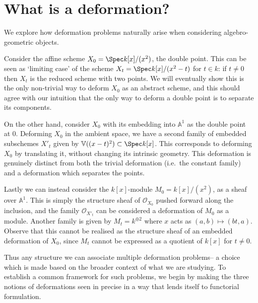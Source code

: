 \section{What is a deformation?}\label{section-whats-a-deformation}

We explore how deformation problems naturally arise when considering
algebro-geometric objects.

\begin{example}
    \label{example-double-point-1}
    Consider the affine scheme \(X_0=\Spec k[x]/(x^2)\), the double point. This
    can be seen as `limiting case' of the scheme \(X_t = \Spec k[x]/(x^2-t)\)
    for \(t\in k\): if \(t\neq 0\) then \(X_t\) is the reduced scheme with two
    points. We will eventually show this is the only non-trivial way to deform
    \(X_0\) as an abstract scheme, and this should agree with our intuition that
    the only way to deform a double point is to separate its components.

    On the other hand, consider \(X_0\) with its embedding into
    \(\mathbb{A}^1\) as the double point at \(0\). Deforming \(X_0\) in the
    ambient space, we have a second family of embedded subschemes \(X'_t\) given
    by \(\mathbb{V}((x-t)^2) \subset \Spec k[x]\). This corresponds to
    deforming \(X_0\) by translating it, without changing its intrinsic
    geometry. This deformation is genuinely distinct from both the trivial
    deformation (i.e.\ the constant family) and a deformation which separates
    the points.

    Lastly we can instead consider the \(k[x]\)-module \(M_0 = k[x]/(x^2)\), as
    a sheaf over \(\mathbb{A}^1\). This is simply the structure sheaf of
    \(\mathscr{O}_{X_0}\) pushed forward along the inclusion, and the family
    \(\mathscr{O}_{X'_t}\) can be considered a deformation of \(M_0\)
    as a module. Another family is given by \(M_t = k^{\oplus 2}\) where \(x\)
    acts as \((a,b) \mapsto (bt, a)\). Observe that this cannot be realised as
    the structure sheaf of an embedded deformation of \(X_0\), since
    \(M_t\) cannot be expressed as a quotient of \(k[x]\) for \(t\neq 0\).
\end{example}

Thus any structure we can associate multiple deformation problems-- a choice
which is made based on the broader context of what we are studying. To establish
a common framework for such problems, we begin by making the three notions of
deformations seen in  precise in a way that lends
itself to functorial formulation.

